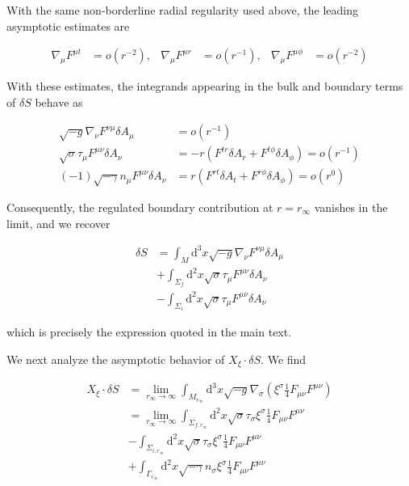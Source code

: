 With the same non-borderline radial regularity used above, the leading asymptotic estimates are

\begin{align}
\nabla _{\mu}F^{\mu t} & =o(r^{-2}), & \nabla _{\mu}F^{\mu r} & =o(r^{-1}), & \nabla _{\mu}F^{\mu \phi} & =o(r^{-2})
\end{align}

With these estimates, the integrands appearing in the bulk and boundary terms of $\delta S$ behave as

\begin{align}
\sqrt{ -g }\nabla _{\nu}F^{\nu \mu}\delta A_{\mu} & =o(r^{-1}) \\
\sqrt{ \sigma }\tau _{\mu}F^{\mu \nu}\delta A_{\nu}
&=-r\left(F^{tr}\delta A_{r}+F^{t\phi}\delta A_{\phi}\right)=o(r^{-1}) \\
(-1)\sqrt{ -\gamma }n_{\mu}F^{\mu \nu}\delta A_{\nu}
&=r\left(F^{rt}\delta A_{t}+F^{r\phi}\delta A_{\phi}\right)=o(r^{0})
\end{align}

Consequently, the regulated boundary contribution at $r=r_{\infty}$ vanishes in the limit, and we recover

\begin{align}
\delta S & =\int _{M}\mathrm{d}^{3}x\sqrt{ -g }\nabla _{\nu}F^{\nu \mu}\delta A_{\mu} \\
 & +\int _{\Sigma _{f}}\mathrm{d}^{2}x\sqrt{ \sigma }\tau _{\mu}F^{\mu \nu}\delta A_{\nu} \\
 & -\int _{\Sigma _{i}}\mathrm{d}^{2}x\sqrt{ \sigma }\tau _{\mu}F^{\mu \nu}\delta A_{\nu}
\end{align}

which is precisely the expression quoted in the main text.

We next analyze the asymptotic behavior of $X_{\xi}\cdot \delta S$. We find

\begin{align}
X_{\xi}\cdot \delta S & =\lim_{ r_{\infty} \to \infty } \int _{M_{r_{\infty}}}\mathrm{d}^{3}x\sqrt{ -g }\nabla _{\sigma}\left(\xi ^{\sigma}\frac{1}{4}F_{\mu \nu}F^{\mu \nu}\right) \\
 & =\lim_{ r_{\infty} \to \infty } \int _{\Sigma _{f,r_{\infty}}}\mathrm{d}^{2}x\sqrt{ \sigma }\tau _{\sigma}\xi ^{\sigma}\frac{1}{4}F_{\mu \nu}F^{\mu \nu} \\
 & -\int _{\Sigma _{i,r_{\infty}}}\mathrm{d}^{2}x\sqrt{ \sigma }\tau _{\sigma}\xi ^{\sigma}\frac{1}{4}F_{\mu \nu}F^{\mu \nu} \\
 & +\int _{\Gamma _{r_{\infty}}}\mathrm{d}^{2}x\sqrt{ -\gamma }n_{\sigma}\xi ^{\sigma}\frac{1}{4}F_{\mu \nu}F^{\mu \nu}
\end{align}

